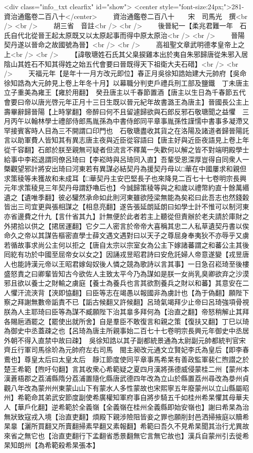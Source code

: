 <div class="info_txt clearfix" id="show">
<center style="font-size:24px;">281-資治通鑑卷二百八十</center>
  　　資治通鑑卷二百八十　　宋　司馬光　撰<br />
<br />
　　胡三省　音註<br />
<br />
　　後晉紀一【柔兆君難一年　石氏自代北從晉王起太原既又以太原起事而得中原太原治<br />
<br />
　　晉陽契丹遂以晉命之故國號為晉】<br />
<br />
　　高祖聖文章武明德孝皇帝上之上<br />
<br />
　　【諱敬瑭姓石氏其父臬捩雞本出於夷自朱邪歸唐從朱邪入居陰山其姓石不知其得姓之始五代會要曰晉既得天下祖衛大夫石碏】<br />
<br />
　　天福元年【是年十一月方改元即位】春正月吳徐知誥始建大元帥府【吳命徐知誥為大元帥見上卷上年冬十月】以幕職分判吏戶禮兵刑工部及鹽鐵　丁未唐主立子重美為雍王【雍於用翻】　癸丑唐主以千春節置酒【唐主以生日為千春節五代會要曰帝以唐光啓元年正月十三日生既以晉元紀年故書潞王為唐主】晉國長公主上壽畢辭歸晉陽【上時掌翻】帝醉曰何不且留遽歸欲與石郎反邪石敬瑭聞之益懼　三月丙午以翰林學士禮部侍郎馬胤孫為中書侍郎同平章事胤孫性謹懦中書事多凝滯又罕接賓客時人目為三不開謂口印門也　石敬瑭盡收其貨之在洛陽及諸道者歸晉陽託言以助軍費人皆知其有異志唐主夜與近臣從容語曰【唐主好與近臣夜語見上卷上年從千容翻】石郎於朕至親無可疑者但流言不釋萬一失歡何以解之皆不對端明殿學士給事中李崧退謂同僚呂琦曰【李崧時與呂琦同入直】吾輩受恩深厚豈得自同衆人一槩觀望邪計將安出琦曰河東若有異謀必結契丹為援契丹母以□華在中國屢求和親但求策稜等未獲故和未成耳【□華契丹主安巴堅長子也來降見二百七十七卷明宗長興元年求策稜見三年契丹母謂舒嚕后也】今誠歸策稜等與之和歲以禮幣約直十餘萬緡遺之【遺唯季翻】彼必驩然承命如此則河東雖欲陸梁無能為矣崧曰此吾志也然錢糓皆出三司宜更與張相謀之【相息亮翻】遂告張延朗延朗曰如學士計不惟可以制河東亦省邊費之什九【言什省其九】計無便於此者若主上聽從但責辦於老夫請於庫財之外捃拾以供之【捃居運翻】它夕二人密言於帝帝大喜稱其忠二人私草遺契丹書以俟命久之帝以其謀告樞密直學士薛文遇文遇對曰以天子之尊屈身奉夷狄不亦辱乎又虜若循故事求尚公主何以拒之【唐自太宗以宗室女為公主下嫁諸蕃謂之和蕃公主其後囘紇有功於中國至屈帝女以女之】因誦戎昱昭君詩曰安危託婦人帝意遂變【戎昱唐人也能詩漢元帝以王昭君嫁匈奴後人憐之競為歌詩以言其事】一日急召崧琦至後樓盛怒責之曰卿輩皆知古今欲佐人主致太平今乃為謀如是朕一女尚乳臭卿欲弃之沙漠邪且欲以養士之財輸之虜庭【養士為養兵也言其欲割養兵之財以和蕃】其意安在二人懼汗流浹背【浹即恊翻】曰臣等志在竭愚以報國非為虜計也【為于偽翻】願陛下察之拜謝無數帝詬責不已【詬古候翻又許候翻】呂琦氣竭拜少止帝曰呂琦強項骨視朕為人主耶琦曰臣等為謀不臧願陛下治其辠多拜何為【治直之翻】帝怒稍解止其拜各賜巵酒罷之【罷使出就所舍】自是羣臣不敢復言和親之策【復扶又翻】丁巳以琦為御史中丞蓋疎之也【呂琦為唐主所親事始二百七十七卷明宗長興元年御史中丞居外朝不得入直禁中故曰疎】　吳徐知誥以其子副都統景通為太尉副元帥都統判官宋齊丘行軍司馬徐玠為元帥府左右司馬　閩主昶改元通文立賢妃李氏為皇后【即李春鷰也】尊皇太后曰太皇太后　靜江節度使同平章事馬希杲有善政監軍裴仁煦譛之於楚王希範【煦吁句翻】言其收衆心希範疑之夏四月漢將孫德威侵蒙桂二州【蒙州本漢蒼梧郡之荔浦縣隋分荔浦置隨化縣唐武德四年改為立山於縣置荔州尋改為㳟州貞觀八年改為蒙州州東蒙山山下有蒙水人多性蒙故也宋熙寧五年廢蒙州以立山縣屬昭州】希範命其弟武安節度副使希廣權知軍府事自將步騎五千如桂州希杲懼其母華夫人【華戶化翻】逆希範於全義嶺【全義嶺在桂州全義縣即始安嶺也】謝曰希杲為治無狀致寇戎入境【治直吏翻】煩殿下親涉險阻皆妾之罪也願削封邑洒掃掖庭以贖希杲辠【灑所買翻又所賣翻掃素早翻又素報翻】希範曰吾久不見希杲聞其治行尤異故來省之無它也【治直吏翻行下孟翻省悉景翻無它言無它故也】漢兵自蒙州引去徙希杲知朗州【為希範殺希杲張本】
